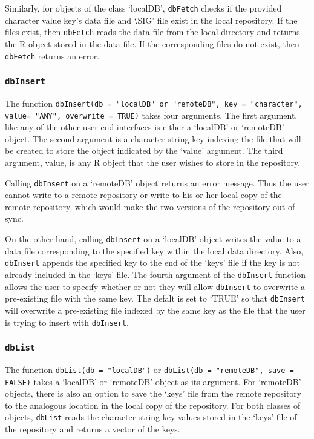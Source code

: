 \documentclass{article}
\newcommand{\code}{\texttt}
\begin{document}
Similarly, for objects of the class `localDB', \code{dbFetch}
checks if the provided character value key's data file and `.SIG' file exist 
in the local repository. If the files exist, then \code{dbFetch} reads the
data file from the local directory and returns the R object stored in the
data file. If the corresponding files do not exist, then \code{dbFetch} 
returns an error. 

\subsubsection{\code{dbInsert}}

The function \code{dbInsert(db = "localDB" or
"remoteDB", key = "character", value= "ANY", overwrite = TRUE)} 
takes four arguments. The first argument, like any of the other user-end
interfaces is either a `localDB' or `remoteDB' object.
The second argument is a character string key indexing the file
that will be created to store the object indicated by the `value'
argument. The third argument, value, is any R object that the user 
wishes to store in the repository. 

Calling \code{dbInsert} on a `remoteDB' object returns an
error message. Thus the user cannot write to a remote repository 
or write to his or her local copy of the remote repository, which would
make the two versions of the repository out of sync. 

On the other hand, calling \code{dbInsert} on a `localDB' object 
writes the value to a data file corresponding to the specified key within 
the local data directory. Also, \code{dbInsert} appends the specified key 
to the end of the `keys' file if the key is not already included in the 
`keys' file. The fourth argument of the \code{dbInsert} function allows the
user to specify whether or not they will allow \code{dbInsert} to overwrite
a pre-existing file with the same key. The defalt is set to `TRUE' so that 
\code{dbInsert} will overwrite a pre-existing file indexed by the same
key as the file that the user is trying to insert with \code{dbInsert}.

\subsubsection{\code{dbList}}

The function \code{dbList(db = "localDB")} or 
\code{dbList(db = "remoteDB", save = FALSE)} takes a `localDB' 
or `remoteDB' object as its argument. For `remoteDB' objects, 
there is also an option to save the `keys' file from the remote repository
to the analogous location in the local copy of the repository. For both 
classes of objects, \code{dbList} reads the character string key values 
stored in the `keys' file of the repository and returns a vector of the 
keys.
\end{document}
